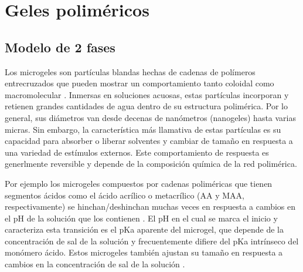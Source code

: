 
\chapter{Geles polim\'ericos} %

\label{Chapter-geles} %


\newcommand{\keyword}[1]{\textbf{#1}}
\newcommand{\tabhead}[1]{\textbf{#1}}
\newcommand{\code}[1]{\texttt{#1}}
\newcommand{\file}[1]{\texttt{\bfseries#1}}
\newcommand{\option}[1]{\texttt{\itshape#1}}





\section{Modelo de 2 fases}

Los microgeles son part\'iculas blandas hechas de cadenas de pol\'imeros entrecruzados que pueden mostrar un comportamiento tanto coloidal como macromolecular \cite{plamper2017functional}.
Inmersas en soluciones acuosas, estas part\'iculas incorporan y retienen grandes cantidades de agua dentro de su estructura polim\'erica.
Por lo general, sus di\'ametros van desde decenas de nan\'ometros (nanogeles) hasta varias micras.
Sin embargo, la caracter\'istica m\'as llamativa de estas part\'iculas es su capacidad para absorber o liberar solventes y cambiar de tama\~no en respuesta a una variedad de est\'imulos externos.
Este comportamiento de respuesta es  generlmente reversible y depende de la composici\'on qu\'imica de la red polim\'erica.


Por ejemplo los microgeles compuestos por cadenas polim\'ericas que tienen segmentos \'acidos como el \'acido acr\'ilico o metacr\'ilico (AA y MAA, respectivamente) se hinchan/deshinchan muchas veces en respuesta a cambios en el pH de la soluci\'on que los contienen \cite{snowden1996colloidal}.
El pH en el cual se marca el inicio y caracteriza esta transici\'on es el pKa aparente del microgel, que depende de la concentraci\'on de sal de la soluci\'on y frecuentemente difiere del pKa intrínseco del mon\'omero \'acido.
Estos microgeles tambi\'en ajustan su tama\~no en respuesta a cambios en la concentraci\'on de sal de la soluci\'on \cite{snowden1996colloidal}.

